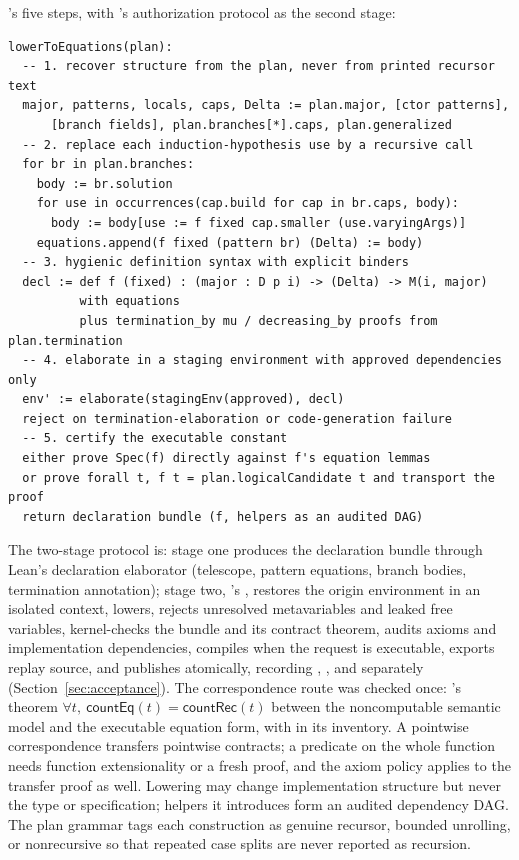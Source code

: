 's five steps, with 's authorization protocol as the second stage:
\begin{lstlisting}
lowerToEquations(plan):
  -- 1. recover structure from the plan, never from printed recursor text
  major, patterns, locals, caps, Delta := plan.major, [ctor patterns],
      [branch fields], plan.branches[*].caps, plan.generalized
  -- 2. replace each induction-hypothesis use by a recursive call
  for br in plan.branches:
    body := br.solution
    for use in occurrences(cap.build for cap in br.caps, body):
      body := body[use := f fixed cap.smaller (use.varyingArgs)]
    equations.append(f fixed (pattern br) (Delta) := body)
  -- 3. hygienic definition syntax with explicit binders
  decl := def f (fixed) : (major : D p i) -> (Delta) -> M(i, major)
          with equations
          plus termination_by mu / decreasing_by proofs from plan.termination
  -- 4. elaborate in a staging environment with approved dependencies only
  env' := elaborate(stagingEnv(approved), decl)
  reject on termination-elaboration or code-generation failure
  -- 5. certify the executable constant
  either prove Spec(f) directly against f's equation lemmas
  or prove forall t, f t = plan.logicalCandidate t and transport the proof
  return declaration bundle (f, helpers as an audited DAG)
\end{lstlisting}
The two-stage protocol is: stage one produces the declaration bundle through Lean's declaration elaborator (telescope, pattern equations, branch bodies, termination annotation); stage two, 's , restores the origin environment in an isolated context, lowers, rejects unresolved metavariables and leaked free variables, kernel-checks the bundle and its contract theorem, audits axioms and implementation dependencies, compiles when the request is executable, exports replay source, and publishes atomically, recording , , and  separately (Section~\ref{sec:acceptance}). The correspondence route was checked once: 's theorem $\forall t,\ \mathsf{countEq}(t) = \mathsf{countRec}(t)$ between the noncomputable semantic model and the executable equation form, with  in its inventory. A pointwise correspondence transfers pointwise contracts; a predicate on the whole function needs function extensionality or a fresh proof, and the axiom policy applies to the transfer proof as well. Lowering may change implementation structure but never the type or specification; helpers it introduces form an audited dependency DAG. The plan grammar tags each construction as genuine recursor, bounded unrolling, or nonrecursive so that repeated case splits are never reported as recursion.

